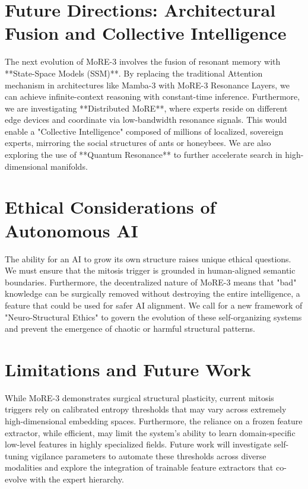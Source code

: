 \documentclass[11pt,hidelinks]{article}
\begin{document}
\section{Future Directions: Architectural Fusion and Collective Intelligence}
The next evolution of MoRE-3 involves the fusion of resonant memory with **State-Space Models (SSM)**. By replacing the traditional Attention mechanism in architectures like Mamba-3 with MoRE-3 Resonance Layers, we can achieve infinite-context reasoning with constant-time inference. Furthermore, we are investigating **Distributed MoRE**, where experts reside on different edge devices and coordinate via low-bandwidth resonance signals. This would enable a "Collective Intelligence" composed of millions of localized, sovereign experts, mirroring the social structures of ants or honeybees. We are also exploring the use of **Quantum Resonance** to further accelerate search in high-dimensional manifolds.

\section{Ethical Considerations of Autonomous AI}
The ability for an AI to grow its own structure raises unique ethical questions. We must ensure that the mitosis trigger is grounded in human-aligned semantic boundaries. Furthermore, the decentralized nature of MoRE-3 means that "bad" knowledge can be surgically removed without destroying the entire intelligence, a feature that could be used for safer AI alignment. We call for a new framework of "Neuro-Structural Ethics" to govern the evolution of these self-organizing systems and prevent the emergence of chaotic or harmful structural patterns.

\section{Limitations and Future Work}
While MoRE-3 demonstrates surgical structural plasticity, current mitosis triggers rely on calibrated entropy thresholds that may vary across extremely high-dimensional embedding spaces. Furthermore, the reliance on a frozen feature extractor, while efficient, may limit the system's ability to learn domain-specific low-level features in highly specialized fields. Future work will investigate self-tuning vigilance parameters to automate these thresholds across diverse modalities and explore the integration of trainable feature extractors that co-evolve with the expert hierarchy.
\end{document}

